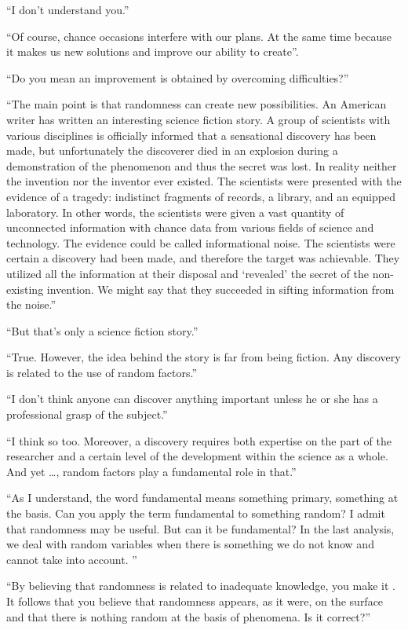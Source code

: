 \begin{dialogue}
\rdr ``I don't understand you.''

\athr ``Of course, chance occasions interfere with our
  plans. At the same time because it makes us new solutions and
  improve our ability to create''.

\rdr ``Do you mean an improvement is obtained by
  overcoming difficulties?''

\athr  ``The main point is that randomness can create new
  possibilities. An American writer has written an interesting science
  fiction story. A group of scientists with various disciplines is officially
informed that a sensational discovery has been made, but unfortunately
the discoverer died in an explosion during a demonstration of the
phenomenon and thus the secret was lost. In reality neither the
invention nor the inventor ever existed. The scientists were presented
with the evidence of a tragedy: indistinct fragments of records, a
library, and an equipped laboratory. In other words, the scientists
were given a vast quantity of unconnected information with chance data
from various fields of science and technology. The evidence could be
called informational noise. The scientists were certain a discovery
had been made, and therefore the target was achievable. They utilized
all the information at their disposal and `revealed' the secret of the
non-existing invention. We might say that they succeeded in sifting information from the noise.''  

\rdr  ``But that's only a science fiction story.''  

\athr  ``True. However, the idea behind the story is far from being
fiction. Any discovery is related to the use of random factors.''  

\rdr  ``I don't think anyone can discover anything important
unless he or she has a professional grasp of the subject.''  

\athr  ``I think so too. Moreover, a discovery requires both
expertise on the part of the researcher and a certain level of the
development within the science as a whole. And yet \ldots, random factors
play a fundamental role in that.'' 

\rdr  ``As I understand, the word fundamental means something
primary, something at the basis. Can you apply the term fundamental to something random? I admit that randomness may be useful. But can it be fundamental? In the last analysis, we deal with random variables when there is something we do not know and cannot take into account. ''  

\athr  ``By believing that randomness is related to inadequate
knowledge, you make it . It follows that you believe that
randomness appears, as it were, on the surface and that there is
nothing random at the basis of phenomena. Is it correct?''  


\end{dialogue}
